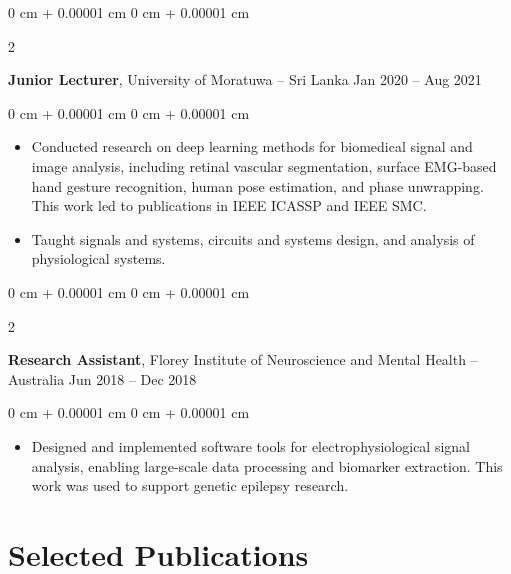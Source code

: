 \documentclass[10pt, letterpaper]{article}
\newenvironment{highlights}{
    \begin{itemize}[
        topsep=0.10 cm,
        parsep=0.10 cm,
        partopsep=0pt,
        itemsep=0pt,
        leftmargin=0 cm + 10pt
    ]
}{
    \end{itemize}
} %
\newenvironment{onecolentry}{
    \begin{adjustwidth}{
        0 cm + 0.00001 cm
    }{
        0 cm + 0.00001 cm
    }
}{
    \end{adjustwidth}
} %
\newenvironment{twocolentry}[2][]{
    \onecolentry
    \def\secondColumn{#2}
    \setcolumnwidth{\fill, 4.5 cm}
    \begin{paracol}{2}
}{
    \switchcolumn \raggedleft \secondColumn
    \end{paracol}
    \endonecolentry
} %
\begin{document}
        \vspace{0.2 cm}

        \begin{twocolentry}{
            Jan 2020 – Aug 2021
        }
            \textbf{Junior Lecturer}, University of Moratuwa -- Sri Lanka\end{twocolentry}

        \vspace{0.10 cm}
        \begin{onecolentry}
            \begin{highlights}
                \item Conducted research on deep learning methods for biomedical signal and image analysis, including retinal vascular segmentation, surface EMG-based hand gesture recognition, human pose estimation, and phase unwrapping. This work led to publications in IEEE ICASSP and IEEE SMC.
                \item Taught signals and systems, circuits and systems design, and analysis of physiological systems.
            \end{highlights}
        \end{onecolentry}

         \vspace{0.2 cm}

        \begin{twocolentry}{
            Jun 2018 – Dec 2018
        }
            \textbf{Research Assistant}, Florey Institute of Neuroscience and Mental Health -- Australia\end{twocolentry}

        \vspace{0.10 cm}
        \begin{onecolentry}
            \begin{highlights}
                \item Designed and implemented software tools for electrophysiological signal analysis, enabling large-scale data processing and biomarker extraction. This work was used to support genetic epilepsy research.
            \end{highlights}
        \end{onecolentry}



    
    \section{Selected Publications}
\end{document}

